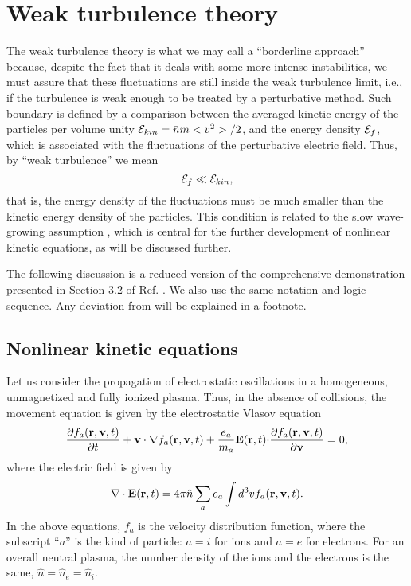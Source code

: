 \documentclass[12pt,a4paper,ruledheader]{report}
\def\calE{{\cal E}}
\begin{document}
\chapter{Weak turbulence theory}
\label{cha:weak-turb}
The weak turbulence theory is what we may call a ``borderline approach''
because, despite the fact that it deals with some more intense
instabilities, we must assure that these fluctuations are still inside
the weak turbulence limit, i.e., if the turbulence is weak enough to be
treated by a perturbative method. Such boundary is defined by a comparison
between the averaged kinetic energy of the particles per volume unity
$\calE_{kin}=\bar n m<v^2>/2$, and the energy density $\calE_f$, which
is associated with the fluctuations of the perturbative electric field.
Thus, by ``weak turbulence'' we mean
\begin{equation}
  \label{eq:weak}
  \calE_f \ll \calE_{kin},
\end{equation}
that is,
the energy density of the fluctuations must be much smaller
than the kinetic energy density of the particles. This condition is
related to the slow wave-growing assumption \cite{david}, which is
central for the further development of nonlinear kinetic equations,
as will be discussed further.

The following discussion is a reduced version of the
comprehensive demonstration presented in Section 3.2 of
Ref. \cite{Tigik2015}. We also use the same notation and
logic sequence. Any deviation from \cite{Tigik2015} will
be explained in a footnote.


\section{Nonlinear kinetic equations}
\label{sec:kin-gen-eq}
Let us consider the propagation of electrostatic oscillations
in a homogeneous, unmagnetized and fully ionized plasma. Thus,
in the absence of collisions, the movement equation is given
by the electrostatic Vlasov equation
\begin{equation}
  \label{vlasov-nl}
  \frac{\partial f_a({\bf r}, {\bf v},t)}{\partial t}
+{\bf v \cdot \nabla}f_a({\bf r}, {\bf v},t)
+\frac{e_a}{m_a}{\bf E}({\bf r},t){\bf \cdot}
\frac{\partial f_a({\bf r},{\bf v},t)}{\partial \bf v}=0,
\end{equation}
where the electric field is given by
\begin{equation}
   {\bf \nabla \cdot E}({\bf r},t)
   =4\pi \hat n \sum_a e_a\int d^3 v f_a({\bf r}, {\bf v},t). 
\end{equation}
In the above equations, $f_a$ is the velocity distribution function,
where the subscript ``$a$'' is the kind of particle: $a=i$ for ions
and $a=e$ for electrons. For an overall neutral plasma, the number
density of
the ions and the electrons is the same, $\hat n = \hat n_e = \hat n_i$.
\end{document}
